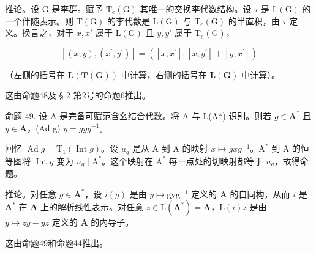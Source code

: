推论。设 G 是李群。赋予 \(\mathrm{T}_{e}(\mathrm{G})\) 其唯一的交换李代数结构。设 \(\tau\) 是 \(\mathrm{L}(\mathrm{G})\) 的一个伴随表示。则 \(\mathrm{T}(\mathrm{G})\) 的李代数是 \(\mathrm{L}(\mathrm{G})\) 与 \(\mathrm{T}_{e}(\mathrm{G})\) 的半直积，由 \(\tau\) 定义。换言之，对于 \(x, x'\) 属于 \(\mathrm{L}(\mathrm{G})\) 且 \(y, y'\) 属于 \(\mathrm{T}_{e}(\mathrm{G})\)，

\[
[ (x, y), (x ^ {\prime}, y ^ {\prime}) ] = ([ x, x ^ {\prime} ], [ x, y ^ {\prime} ] + [ y, x ^ {\prime} ])
\]

（左侧的括号在 \(\mathbf{L}(\mathbf{T}(\mathbf{G}))\) 中计算，右侧的括号在 \(\mathbf{L}(\mathbf{G})\) 中计算）。

这由命题48及 § 2 第2号的命题6推出。

命题 49. 设 A 是完备可赋范含幺结合代数。将 A 与 L(A*) 识别。则若 \(g \in \mathbf{A}^*\) 且 \(y \in \mathbf{A}\)，(Ad g) \(y = gyg^{-1}\)。

回忆 \(\operatorname{Ad} g = \mathrm{T}_{1}(\operatorname{Int} g)\)。设 \(u_{g}\) 是从 A 到 A 的映射 \(x \mapsto gxg^{-1}\)。\(\mathrm{A}^{*}\) 到 A 的恒等图将 \(\operatorname{Int} g\) 变为 \(u_{g} \mid \mathrm{A}^{*}\)。这个映射在 \(\mathrm{A}^{*}\) 每一点处的切映射都等于 \(u_{g}\)，故得命题。

推论。对任意 \(g \in \mathbf{A}^*\)，设 \(i(g)\) 是由 \(y \mapsto \mathrm{gyg}^{-1}\) 定义的 \(\mathbf{A}\) 的自同构，从而 \(i\) 是 \(\mathbf{A}^*\) 在 \(\mathbf{A}\) 上的解析线性表示。对任意 \(z \in \mathrm{L}(\mathbf{A}^*) = \mathbf{A}\)，\(\mathrm{L}(i)z\) 是由 \(y \mapsto zy - yz\) 定义的 \(\mathbf{A}\) 的内导子。

这由命题49和命题44推出。

